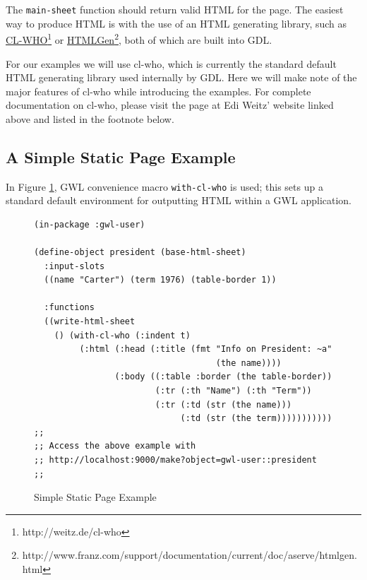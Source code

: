 \documentclass [11pt]{book}
\begin{document}
The \texttt{main-sheet} function should return valid
HTML for the page. The easiest way to produce HTML is with the use of
an HTML generating library, such as \href{http://weitz.de/cl-who}{CL-WHO}\footnote{http://weitz.de/cl-who} or \href{http://www.franz.com/support/documentation/current/doc/aserve/htmlgen.html}{HTMLGen}\footnote{http://www.franz.com/support/documentation/current/doc/aserve/htmlgen.html}, both of which are built into GDL.



For our examples we will use cl-who, which is currently the
standard default HTML generating library used internally by GDL. Here
we will make note of the major features of cl-who while introducing
the examples. For complete documentation on cl-who, please visit the
page at Edi Weitz' website linked above and listed in the footnote
below.



\subsection{A Simple Static Page Example}

\label{subsec:asimplestaticpageexample}



In Figure 
\ref{fig:gwl-1}, GWL convenience macro \texttt{with-cl-who} is used; this sets up a standard default environment for outputting HTML 
within a GWL application.
\begin{figure}
\begin{lrbox}{\boxedverb}
\begin{minipage}{\linewidth}

\begin{verbatim}(in-package :gwl-user)

(define-object president (base-html-sheet)
  :input-slots
  ((name "Carter") (term 1976) (table-border 1))

  :functions
  ((write-html-sheet
    () (with-cl-who (:indent t)
         (:html (:head (:title (fmt "Info on President: ~a" 
                                    (the name))))
                (:body ((:table :border (the table-border))
                        (:tr (:th "Name") (:th "Term"))
                        (:tr (:td (str (the name))) 
                             (:td (str (the term)))))))))))
;;
;; Access the above example with 
;; http://localhost:9000/make?object=gwl-user::president
;;

\end{verbatim}
\end{minipage}
\end{lrbox}
\fbox{\usebox{\boxedverb}}

\caption{Simple Static Page Example}

\label{fig:gwl-1}

\end{figure}
\end{document}
